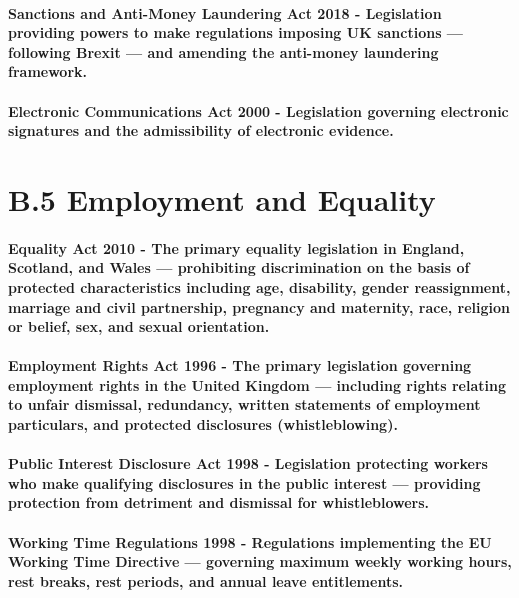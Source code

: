 \paragraph{\textbf{Sanctions and Anti-Money Laundering Act 2018} - Legislation providing powers to make regulations imposing UK sanctions — following Brexit — and amending the anti-money laundering framework.}
\paragraph{\textbf{Electronic Communications Act 2000} - Legislation governing electronic signatures and the admissibility of electronic evidence.}

\section*{B.5 Employment and Equality}
\paragraph{\textbf{Equality Act 2010} - The primary equality legislation in England, Scotland, and Wales — prohibiting discrimination on the basis of protected characteristics including age, disability, gender reassignment, marriage and civil partnership, pregnancy and maternity, race, religion or belief, sex, and sexual orientation.}
\paragraph{\textbf{Employment Rights Act 1996} - The primary legislation governing employment rights in the United Kingdom — including rights relating to unfair dismissal, redundancy, written statements of employment particulars, and protected disclosures (whistleblowing).}
\paragraph{\textbf{Public Interest Disclosure Act 1998} - Legislation protecting workers who make qualifying disclosures in the public interest — providing protection from detriment and dismissal for whistleblowers.}
\paragraph{\textbf{Working Time Regulations 1998} - Regulations implementing the EU Working Time Directive — governing maximum weekly working hours, rest breaks, rest periods, and annual leave entitlements.}

